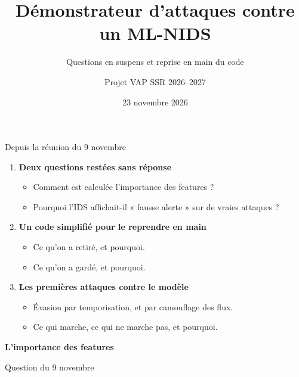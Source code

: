 \documentclass[aspectratio=169,11pt,xcolor=table]{beamer}
\title[Démonstrateur ML-NIDS]{Démonstrateur d'attaques contre un ML-NIDS}
\subtitle{Questions en suspens et reprise en main du code}
\author{Projet VAP SSR 2026--2027}
\institute{Réunion avec Grégory Blanc}
\date{23 novembre 2026}
\newcommand{\espacement}{\setlength{\itemsep}{.7em}}
\begin{document}
\begin{frame}
  \titlepage
\end{frame}

\begin{frame}{Depuis la réunion du 9 novembre}
  \begin{enumerate}\espacement
    \item \textbf{Deux questions restées sans réponse}
      \begin{itemize}
        \item Comment est calculée l'importance des features ?
        \item Pourquoi l'IDS affichait-il « fausse alerte » sur de vraies attaques ?
      \end{itemize}
    \item \textbf{Un code simplifié pour le reprendre en main}
      \begin{itemize}
        \item Ce qu'on a retiré, et pourquoi.
        \item Ce qu'on a gardé, et pourquoi.
      \end{itemize}
    \item \textbf{Les premières attaques contre le modèle}
      \begin{itemize}
        \item Évasion par temporisation, et par camouflage des flux.
        \item Ce qui marche, ce qui ne marche pas, et pourquoi.
      \end{itemize}
  \end{enumerate}
\end{frame}


\begin{frame}[plain]
  \centering
  \vfill
  {\fontsize{28}{36}\selectfont\bfseries\color{projectblue} L'importance des features\par}
  \vspace{.8em}
  {\large Question du 9 novembre\par}
  \vfill
\end{frame}
\end{document}
